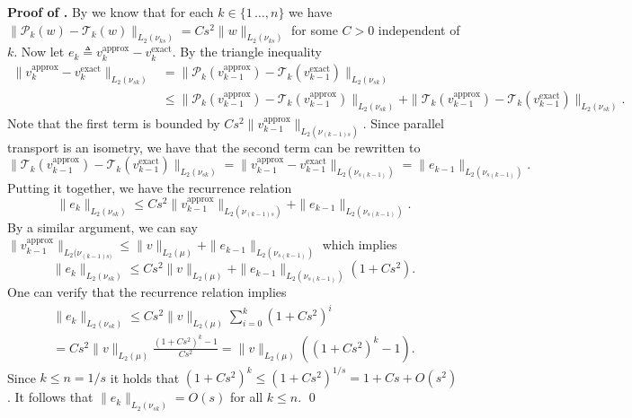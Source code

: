 \documentclass[11pt]{article}
\begin{document}
\noindent \textbf{Proof of .} By  we know that for each $k \in \{1\, \dots , n\}$ we have $\|\mathcal{P}_k(w) - \mathcal{T}_k(w)\|_{L_2(\nu_{ks})} = Cs^2\|w\|_{L_2(\nu_{ks})}$ for some $C > 0$ independent of $k$. Now let $e_k \triangleq v^{\text{approx}}_k - v^{\text{exact}}_k.$ By the triangle inequality
\begin{align*}
    \|v^{\text{approx}}_k - v^{\text{exact}}_k\|_{L_2(\nu_{sk})}  &= \|\mathcal{P}_k(v_{k-1}^{\text{approx}}) - \mathcal{T}_k(v_{k-1}^{\text{exact}})\|_{L_2(\nu_{sk})}\\ &\leq \|\mathcal{P}_k(v_{k-1}^{\text{approx}}) - \mathcal{T}_k(v_{k-1}^{\text{approx}})\|_{L_2(\nu_{sk})} + \|\mathcal{T}_k(v_{k-1}^{\text{approx}}) - \mathcal{T}_k(v_{k-1}^{\text{exact}})\|_{L_2(\nu_{sk})}.
\end{align*}
Note that the first term is bounded by $Cs^2\|v^{\text{approx}}_{k - 1}\|_{L_2(\nu_{(k-1)s})}$. Since parallel transport is an isometry, we have that the second term can be rewritten to
\[\|\mathcal{T}_k(v_{k-1}^{\text{approx}}) - \mathcal{T}_k(v_{k-1}^{\text{exact}})\|_{L_2(\nu_{sk})} = \|v_{k-1}^{\text{approx}} - v_{k-1}^{\text{exact}}\|_{L_2(\nu_{s(k-1)})} = \|e_{k-1}\|_{L_2(\nu_{s(k-1)})}.\]
Putting it together, we have the recurrence relation 
\[\|e_k\|_{L_2(\nu_{sk})} \leq Cs^2\|v^{\text{approx}}_{k - 1}\|_{L_2(\nu_{(k-1)s})} + \|e_{k-1}\|_{L_2(\nu_{s(k-1)})}.\]
By a similar argument, we can say $\|v_{k-1}^{\text{approx}}\|_{L_2(\nu_{(k-1)s)}} \leq \|v\|_{L_2(\mu)} + \|e_{k-1}\|_{L_2(\nu_{s(k-1)})}$ which implies 
\[\|e_k\|_{L_2(\nu_{sk})} \leq Cs^2\|v\|_{L_2(\mu)} + \|e_{k-1}\|_{L_2(\nu_{s(k-1)})}\left( 1 + Cs^2\right).\]
One can verify that the recurrence relation implies
\begin{multline} \label{eq: error recursion}
\|e_k\|_{L_2(\nu_{sk})} \leq Cs^2\|v\|_{L_2(\mu)}\sum_{i = 0}^k(1 + Cs^2)^i\\ = Cs^2\|v\|_{L_2(\mu)} \frac{(1 + Cs^2)^{k} - 1}{Cs^2} = \|v\|_{L_2(\mu)}\left((1 + Cs^2)^{k} - 1\right).\end{multline}
Since $k \leq n = 1/s$ it holds that $(1 + Cs^2)^k \leq (1 + Cs^2)^{1/s}  = 1 + Cs + O(s^2)$. It follows that $\|e_k\|_{L_2(\nu_{sk})} = O(s)$
for all $k \leq n$. 
\qed{}
\\
\end{document}
